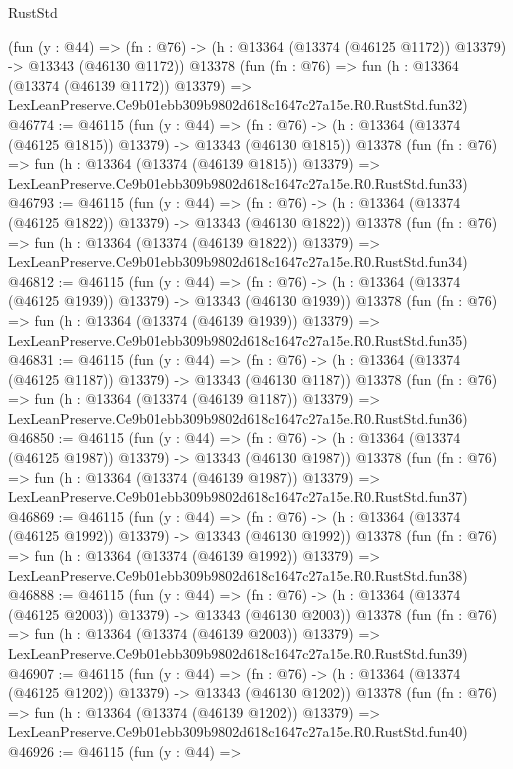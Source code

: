 \begin{lexlean}{RustStd}
\begin{coremodule}
    (fun (y : @44) =>
    (fn : @76) -> (h : @13364 (@13374 (@46125 @1172)) @13379) -> @13343 (@46130 @1172))
    @13378
    (fun (fn : @76) =>
    fun (h : @13364 (@13374 (@46139 @1172)) @13379) =>
    LexLeanPreserve.Ce9b01ebb309b9802d618c1647c27a15e.R0.RustStd.fun32)
@46774 := @46115
    (fun (y : @44) =>
    (fn : @76) -> (h : @13364 (@13374 (@46125 @1815)) @13379) -> @13343 (@46130 @1815))
    @13378
    (fun (fn : @76) =>
    fun (h : @13364 (@13374 (@46139 @1815)) @13379) =>
    LexLeanPreserve.Ce9b01ebb309b9802d618c1647c27a15e.R0.RustStd.fun33)
@46793 := @46115
    (fun (y : @44) =>
    (fn : @76) -> (h : @13364 (@13374 (@46125 @1822)) @13379) -> @13343 (@46130 @1822))
    @13378
    (fun (fn : @76) =>
    fun (h : @13364 (@13374 (@46139 @1822)) @13379) =>
    LexLeanPreserve.Ce9b01ebb309b9802d618c1647c27a15e.R0.RustStd.fun34)
@46812 := @46115
    (fun (y : @44) =>
    (fn : @76) -> (h : @13364 (@13374 (@46125 @1939)) @13379) -> @13343 (@46130 @1939))
    @13378
    (fun (fn : @76) =>
    fun (h : @13364 (@13374 (@46139 @1939)) @13379) =>
    LexLeanPreserve.Ce9b01ebb309b9802d618c1647c27a15e.R0.RustStd.fun35)
@46831 := @46115
    (fun (y : @44) =>
    (fn : @76) -> (h : @13364 (@13374 (@46125 @1187)) @13379) -> @13343 (@46130 @1187))
    @13378
    (fun (fn : @76) =>
    fun (h : @13364 (@13374 (@46139 @1187)) @13379) =>
    LexLeanPreserve.Ce9b01ebb309b9802d618c1647c27a15e.R0.RustStd.fun36)
@46850 := @46115
    (fun (y : @44) =>
    (fn : @76) -> (h : @13364 (@13374 (@46125 @1987)) @13379) -> @13343 (@46130 @1987))
    @13378
    (fun (fn : @76) =>
    fun (h : @13364 (@13374 (@46139 @1987)) @13379) =>
    LexLeanPreserve.Ce9b01ebb309b9802d618c1647c27a15e.R0.RustStd.fun37)
@46869 := @46115
    (fun (y : @44) =>
    (fn : @76) -> (h : @13364 (@13374 (@46125 @1992)) @13379) -> @13343 (@46130 @1992))
    @13378
    (fun (fn : @76) =>
    fun (h : @13364 (@13374 (@46139 @1992)) @13379) =>
    LexLeanPreserve.Ce9b01ebb309b9802d618c1647c27a15e.R0.RustStd.fun38)
@46888 := @46115
    (fun (y : @44) =>
    (fn : @76) -> (h : @13364 (@13374 (@46125 @2003)) @13379) -> @13343 (@46130 @2003))
    @13378
    (fun (fn : @76) =>
    fun (h : @13364 (@13374 (@46139 @2003)) @13379) =>
    LexLeanPreserve.Ce9b01ebb309b9802d618c1647c27a15e.R0.RustStd.fun39)
@46907 := @46115
    (fun (y : @44) =>
    (fn : @76) -> (h : @13364 (@13374 (@46125 @1202)) @13379) -> @13343 (@46130 @1202))
    @13378
    (fun (fn : @76) =>
    fun (h : @13364 (@13374 (@46139 @1202)) @13379) =>
    LexLeanPreserve.Ce9b01ebb309b9802d618c1647c27a15e.R0.RustStd.fun40)
@46926 := @46115
    (fun (y : @44) =>

\end{coremodule}
\end{lexlean}
